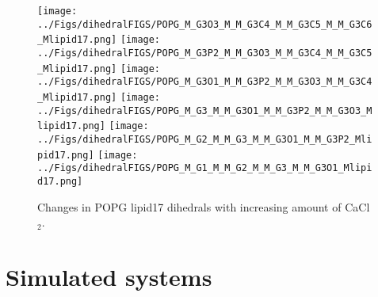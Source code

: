 \documentclass[journal=jpcbfk]{achemso}
\begin{document}
\begin{figure}[]
  \centering
  \texttt{[image: ../Figs/dihedralFIGS/POPG\_M\_G3O3\_M\_M\_G3C4\_M\_M\_G3C5\_M\_M\_G3C6\_Mlipid17.png]}
  \texttt{[image: ../Figs/dihedralFIGS/POPG\_M\_G3P2\_M\_M\_G3O3\_M\_M\_G3C4\_M\_M\_G3C5\_Mlipid17.png]}
  \texttt{[image: ../Figs/dihedralFIGS/POPG\_M\_G3O1\_M\_M\_G3P2\_M\_M\_G3O3\_M\_M\_G3C4\_Mlipid17.png]}
  \texttt{[image: ../Figs/dihedralFIGS/POPG\_M\_G3\_M\_M\_G3O1\_M\_M\_G3P2\_M\_M\_G3O3\_Mlipid17.png]}
  \texttt{[image: ../Figs/dihedralFIGS/POPG\_M\_G2\_M\_M\_G3\_M\_M\_G3O1\_M\_M\_G3P2\_Mlipid17.png]}
  \texttt{[image: ../Figs/dihedralFIGS/POPG\_M\_G1\_M\_M\_G2\_M\_M\_G3\_M\_M\_G3O1\_Mlipid17.png]}  
  \caption{\label{DIHSwithCAlipid17POPG}
    Changes in POPG lipid17 dihedrals with increasing amount of CaCl$_2$.
  }
\end{figure}






\clearpage
\section{Simulated systems}
\end{document}
